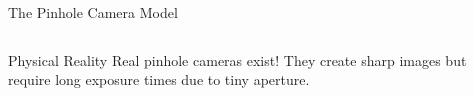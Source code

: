 \begin{frame}{The Pinhole Camera Model}
\begin{columns}
\begin{column}{0.5\textwidth}
        \end{column}
    \end{columns}

    \begin{conceptbox}{Physical Reality}
        Real pinhole cameras exist! They create sharp images but require long exposure times due to tiny aperture.
    \end{conceptbox}
\end{frame}

